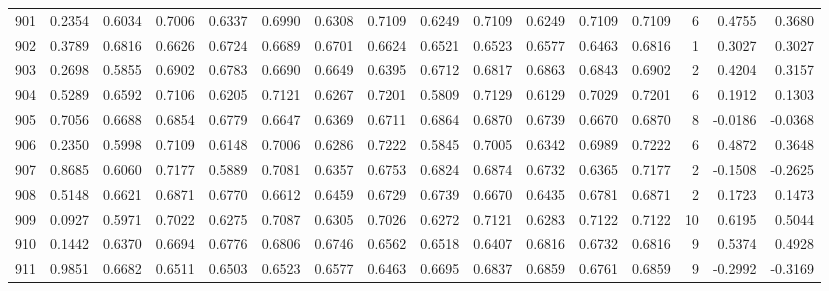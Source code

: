 \begin{tabular}{lrrrrrrrrrrrrrrr}
901 &      0.2354 &  0.6034 &  0.7006 &  0.6337 &  0.6990 &  0.6308 &  0.7109 &  0.6249 &  0.7109 &  0.6249 &   0.7109 &     0.7109 &      6 &                    0.4755 &                     0.3680 \\
902 &      0.3789 &  0.6816 &  0.6626 &  0.6724 &  0.6689 &  0.6701 &  0.6624 &  0.6521 &  0.6523 &  0.6577 &   0.6463 &     0.6816 &      1 &                    0.3027 &                     0.3027 \\
903 &      0.2698 &  0.5855 &  0.6902 &  0.6783 &  0.6690 &  0.6649 &  0.6395 &  0.6712 &  0.6817 &  0.6863 &   0.6843 &     0.6902 &      2 &                    0.4204 &                     0.3157 \\
904 &      0.5289 &  0.6592 &  0.7106 &  0.6205 &  0.7121 &  0.6267 &  0.7201 &  0.5809 &  0.7129 &  0.6129 &   0.7029 &     0.7201 &      6 &                    0.1912 &                     0.1303 \\
905 &      0.7056 &  0.6688 &  0.6854 &  0.6779 &  0.6647 &  0.6369 &  0.6711 &  0.6864 &  0.6870 &  0.6739 &   0.6670 &     0.6870 &      8 &                   -0.0186 &                    -0.0368 \\
906 &      0.2350 &  0.5998 &  0.7109 &  0.6148 &  0.7006 &  0.6286 &  0.7222 &  0.5845 &  0.7005 &  0.6342 &   0.6989 &     0.7222 &      6 &                    0.4872 &                     0.3648 \\
907 &      0.8685 &  0.6060 &  0.7177 &  0.5889 &  0.7081 &  0.6357 &  0.6753 &  0.6824 &  0.6874 &  0.6732 &   0.6365 &     0.7177 &      2 &                   -0.1508 &                    -0.2625 \\
908 &      0.5148 &  0.6621 &  0.6871 &  0.6770 &  0.6612 &  0.6459 &  0.6729 &  0.6739 &  0.6670 &  0.6435 &   0.6781 &     0.6871 &      2 &                    0.1723 &                     0.1473 \\
909 &      0.0927 &  0.5971 &  0.7022 &  0.6275 &  0.7087 &  0.6305 &  0.7026 &  0.6272 &  0.7121 &  0.6283 &   0.7122 &     0.7122 &     10 &                    0.6195 &                     0.5044 \\
910 &      0.1442 &  0.6370 &  0.6694 &  0.6776 &  0.6806 &  0.6746 &  0.6562 &  0.6518 &  0.6407 &  0.6816 &   0.6732 &     0.6816 &      9 &                    0.5374 &                     0.4928 \\
911 &      0.9851 &  0.6682 &  0.6511 &  0.6503 &  0.6523 &  0.6577 &  0.6463 &  0.6695 &  0.6837 &  0.6859 &   0.6761 &     0.6859 &      9 &                   -0.2992 &                    -0.3169 \\

\end{tabular}
